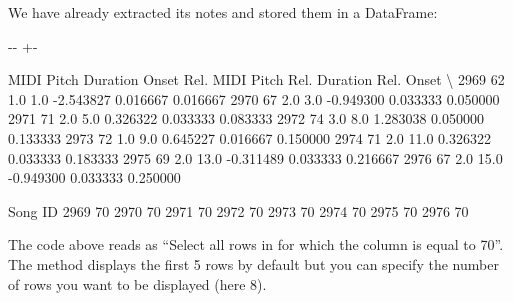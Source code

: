 \documentclass[letterpaper,10pt,english]{sphinxmanual}
\newlength\nbsphinxcodecellspacing
\begin{document}
We have already extracted its notes and stored them in a DataFrame:

{
\begin{sphinxVerbatim}[commandchars=\\\{\}]
\llap{\color{nbsphinxin}[55]:\,\hspace{\fboxrule}\hspace{\fboxsep}}\PYG{p}{[}\PYG{p}{[}\PYG{p}{]}  \PYG{p}{]}
\end{sphinxVerbatim}
}

{

\kern-\sphinxverbatimsmallskipamount\kern-\baselineskip
\kern+\FrameHeightAdjust\kern-\fboxrule
\vspace{\nbsphinxcodecellspacing}

\begin{sphinxVerbatim}[commandchars=\\\{\}]
\llap{\color{nbsphinxout}[55]:\,\hspace{\fboxrule}\hspace{\fboxsep}}      MIDI Pitch  Duration  Onset  Rel. MIDI Pitch  Rel. Duration  Rel. Onset  \textbackslash{}
2969          62       1.0    1.0        -2.543827       0.016667    0.016667
2970          67       2.0    3.0        -0.949300       0.033333    0.050000
2971          71       2.0    5.0         0.326322       0.033333    0.083333
2972          74       3.0    8.0         1.283038       0.050000    0.133333
2973          72       1.0    9.0         0.645227       0.016667    0.150000
2974          71       2.0   11.0         0.326322       0.033333    0.183333
2975          69       2.0   13.0        -0.311489       0.033333    0.216667
2976          67       2.0   15.0        -0.949300       0.033333    0.250000

      Song ID
2969       70
2970       70
2971       70
2972       70
2973       70
2974       70
2975       70
2976       70
\end{sphinxVerbatim}
}

The code above reads as “Select all rows in  for which the column  is equal to 70”. The  method displays the first 5 rows by default but you can specify the number of rows you want to be displayed (here 8).
\end{document}
